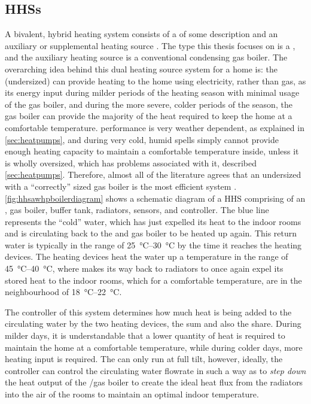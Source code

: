 \subsection{\acsp{HHS}}
A bivalent, hybrid \HP heating system consists of a \HP of some description and an auxiliary or supplemental heating source \cite{blackman_study_2019}. The \HP type this thesis focuses on is a \AWHP, and the auxiliary heating source is a conventional condensing gas boiler. The overarching idea behind this dual heating source system for a home is: the (undersized) \HP can provide heating to the home using electricity, rather than gas, as its energy input during milder periods of the heating season with minimal usage of the gas boiler, and during the more severe, colder periods of the season, the gas boiler can provide the majority of the heat required to keep the home at a comfortable temperature. \AWHP performance is very weather dependent, as explained in \cref{sec:heatpumps}, and during very cold, humid spells simply cannot provide enough heating capacity to maintain a comfortable temperature inside, unless it is wholly oversized, which has problems associated with it, described \cref{sec:heatpumps}. Therefore, almost all of the literature agrees that an undersized \HP with a ``correctly'' sized gas boiler is the most efficient system \cite{park_performance_2014,bagarella_annual_2016,dongellini_influence_2021,rauschkolb_cost-optimal_2020}. \cref{fig:hhsawhpboilerdiagram} shows a schematic diagram of a \ac{HHS} comprising of an \AWHP, gas boiler, buffer tank, radiators, sensors, and controller. The blue line represents the ``cold'' water, which has just expelled its heat to the indoor rooms and is circulating back to the \HP and gas boiler to be heated up again. This return water is typically in the range of \qtyrange{25}{30}{\celsius} by the time it reaches the heating devices. The heating devices heat the water up a temperature in the range of \qtyrange{45}{40}{\celsius}, where makes its way back to radiators to once again expel its stored heat to the indoor rooms, which for a comfortable temperature, are in the neighbourhood of \qtyrange{18}{22}{\celsius}.

The controller of this system determines how much heat is being added to the circulating water by the two heating devices, the sum and also the share. During milder days, it is understandable that a lower quantity of heat is required to maintain the home at a comfortable temperature, while during colder days, more heating input is required. The \AWHP can only run at full tilt, however, ideally, the controller can control the circulating water flowrate in such a way as to \textit{step down} the heat output of the \AWHP/gas boiler to create the ideal heat flux from the radiators into the air of the rooms to maintain an optimal indoor temperature.

